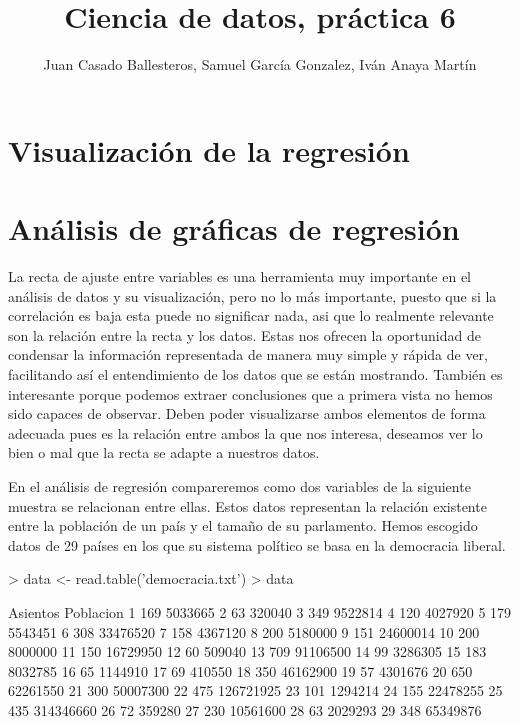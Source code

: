 \documentclass [a4paper] {article}
\title{Ciencia de datos, práctica 6}
\author{Juan Casado Ballesteros, Samuel García Gonzalez, Iván Anaya Martín}
\begin{document}
\maketitle

\begin{abstract}

\end{abstract}

\newpage
\tableofcontents


\newpage
\section{Visualización de la regresión}


\section{Análisis de gráficas de regresión}
La recta de ajuste entre variables es una herramienta muy importante en el análisis de datos y su visualización, pero no lo más importante, puesto que 
si la correlación es baja esta puede no significar nada, asi que lo realmente relevante son la relación entre la recta y los datos. 
Estas nos ofrecen la oportunidad de condensar la información representada de manera muy simple y rápida de ver, facilitando así 
el entendimiento de los datos que se están mostrando. También es interesante porque podemos extraer conclusiones que 
a primera vista no hemos sido capaces de observar. 
Deben poder visualizarse ambos elementos de forma adecuada pues es la relación entre ambos la que nos interesa, deseamos ver lo bien o mal que la recta se adapte a nuestros datos.

En el análisis de regresión compareremos como dos variables de la siguiente muestra se relacionan entre ellas.
Estos datos representan la relación existente entre la población de un país y el tamaño de su parlamento. Hemos escogido datos de 29 países en los
que su sistema político se basa en la democracia liberal.

\begin{Schunk}
\begin{Sinput}
> data <- read.table('democracia.txt')
> data
\end{Sinput}
\begin{Soutput}
   Asientos Poblacion
1       169   5033665
2        63    320040
3       349   9522814
4       120   4027920
5       179   5543451
6       308  33476520
7       158   4367120
8       200   5180000
9       151  24600014
10      200   8000000
11      150  16729950
12       60    509040
13      709  91106500
14       99   3286305
15      183   8032785
16       65   1144910
17       69    410550
18      350  46162900
19       57   4301676
20      650  62261550
21      300  50007300
22      475 126721925
23      101   1294214
24      155  22478255
25      435 314346660
26       72    359280
27      230  10561600
28       63   2029293
29      348  65349876
\end{Soutput}
\end{Schunk}
\end{document}
